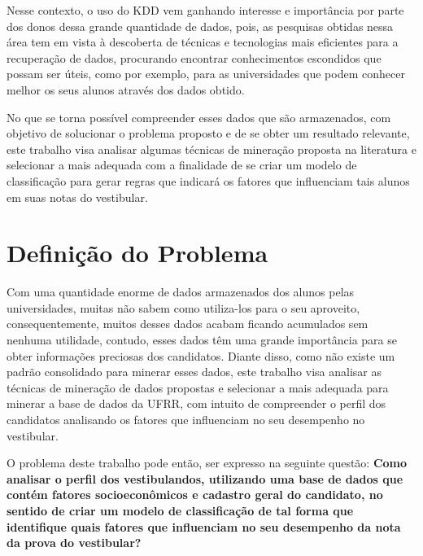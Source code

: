 \par
Nesse contexto, o uso do KDD vem ganhando interesse e importância por parte dos donos dessa grande quantidade de dados, pois, as pesquisas obtidas nessa área tem em vista à descoberta de técnicas e tecnologias mais eficientes para a recuperação de dados, procurando encontrar conhecimentos escondidos que possam ser úteis, como por exemplo, para as universidades que podem conhecer melhor os seus alunos através dos dados obtido.

No que se torna possível compreender esses dados que são armazenados, com objetivo de solucionar o problema proposto e de se obter um resultado relevante, este trabalho visa analisar algumas técnicas de mineração proposta na literatura e selecionar a mais adequada com a finalidade de se criar um modelo de classificação para gerar regras que indicará os fatores que influenciam tais alunos em suas notas do vestibular.


\section{Definição do Problema}

\par
Com uma quantidade enorme de dados armazenados dos alunos pelas universidades, muitas não sabem como utiliza-los para o seu aproveito, consequentemente, muitos desses dados acabam ficando acumulados sem nenhuma utilidade, contudo, esses dados têm uma grande importância para se obter informações preciosas dos candidatos. Diante disso, como não existe um padrão consolidado para minerar esses dados, este trabalho visa analisar as técnicas de mineração de dados propostas e selecionar a mais adequada para minerar a base de dados da UFRR, com intuito de compreender o perfil dos candidatos analisando os fatores que influenciam no seu desempenho no vestibular.

\par
O problema deste trabalho pode então, ser expresso na seguinte questão: \textbf{Como analisar o perfil dos vestibulandos, utilizando uma base de dados que contém fatores socioeconômicos e cadastro geral do candidato, no sentido de criar um modelo de classificação de tal forma que identifique quais fatores que influenciam no seu desempenho da nota  da prova do vestibular? }



